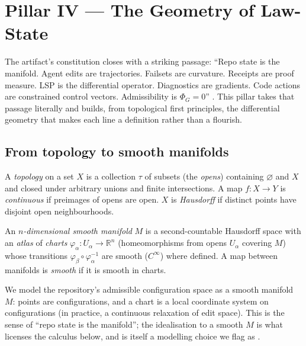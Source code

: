 \section{Pillar IV --- The Geometry of Law-State}
\label{sec:geometry}

The artifact's constitution closes with a striking passage: ``Repo state is the
manifold. Agent edits are trajectories. Failsets are curvature. Receipts are proof
measure. LSP is the differential operator. Diagnostics are gradients. Code actions
are constrained control vectors. Admissibility is $\Phi_G=0$''
\citep{lspmax}. This pillar takes that passage literally and builds, from
topological first principles, the differential geometry that makes each line a
definition rather than a flourish.

\subsection{From topology to smooth manifolds}
\label{sec:geo-manifold}

\begin{definition}
A \emph{topology} on a set $X$ is a collection $\tau$ of subsets (the
\emph{opens}) containing $\varnothing$ and $X$ and closed under arbitrary unions
and finite intersections. A map $f\colon X\to Y$ is \emph{continuous} if
preimages of opens are open. $X$ is \emph{Hausdorff} if distinct points have
disjoint open neighbourhoods.
\end{definition}

\begin{definition}
An \emph{$n$-dimensional smooth manifold} $M$ is a second-countable Hausdorff
space with an \emph{atlas} of \emph{charts} $\varphi_\alpha\colon U_\alpha\to
\mathbb R^{n}$ (homeomorphisms from opens $U_\alpha$ covering $M$) whose
transitions $\varphi_\beta\circ\varphi_\alpha^{-1}$ are smooth ($C^\infty$) where
defined. A map between manifolds is \emph{smooth} if it is smooth in charts.
\end{definition}

\begin{notation}
We model the repository's admissible configuration space as a smooth manifold $M$:
points are configurations, and a chart is a local coordinate system on
configurations (in practice, a continuous relaxation of edit space). This is the
sense of ``repo state is the manifold''; the idealisation to a smooth $M$ is what
licenses the calculus below, and is itself a modelling choice we flag as
\candidate.
\end{notation}


